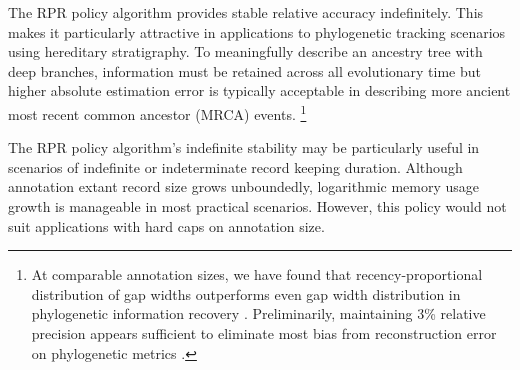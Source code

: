 The RPR policy algorithm provides stable relative accuracy indefinitely.
This makes it particularly attractive in applications to phylogenetic tracking scenarios using hereditary stratigraphy.
To meaningfully describe an ancestry tree with deep branches, information must be retained across all evolutionary time but higher absolute estimation error is typically acceptable in describing more ancient most recent common ancestor (MRCA) events.%
\footnote{%
At comparable annotation sizes, we have found that recency-proportional distribution of gap widths outperforms even gap width distribution in phylogenetic information recovery \citep{moreno2022hereditary}.
Preliminarily, maintaining 3\% relative precision appears sufficient to eliminate most bias from reconstruction error on phylogenetic metrics \citep{moreno2023toward}.
}

The RPR policy algorithm's indefinite stability may be particularly useful in scenarios of indefinite or indeterminate record keeping duration.
Although annotation extant record size grows unboundedly, logarithmic memory usage growth is manageable in most practical scenarios.
However, this policy would not suit applications with hard caps on annotation size. %


% 
% 

% 

% 
